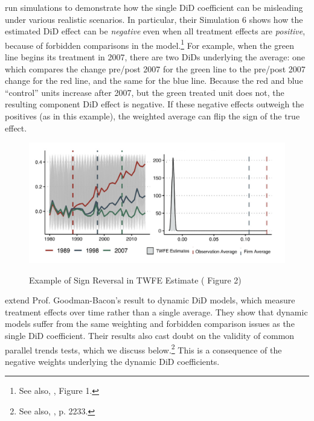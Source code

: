 \documentclass[12pt]{article}
\begin{document}
\citet{baker2022much} run simulations to demonstrate how the single DiD coefficient can be misleading under various realistic scenarios. In particular, their Simulation 6 shows how the estimated DiD effect can be \textit{negative} even when all treatment effects are \textit{positive}, because of forbidden comparisons in the model.\footnote{See also, \citet{sunshapiro2022a}, Figure 1.}  For example, when the green line begins its treatment in  2007, there are two DiDs underlying the average: one which compares the change pre/post 2007 for the green line to the pre/post 2007 change for the red line, and the same for the blue line. Because the red and blue “control” units increase after 2007, but the green treated unit does not, the resulting component DiD effect is negative. If these negative effects outweigh the positives (as in this example), the weighted average can flip the sign of the true effect.
\begin{figure}[H]
    \centering
    \caption{Example of Sign Reversal in TWFE Estimate (\citet{baker2022much} Figure 2)}
    \includegraphics[width=6in]{Figures/Baker et al. (2022) Figure 2.png}
    \label{fig:baker-fig2}
\end{figure}
\noindent \citet{sunabr2021a} extend Prof. Goodman-Bacon’s result to dynamic DiD models, which measure treatment effects over time rather than a single average. They show that dynamic models suffer from the same weighting and forbidden comparison issues as the single DiD coefficient. Their results also cast doubt on the validity of common parallel trends tests, which we discuss below.\footnote{See also, \citet{roth2023s}, p. 2233.}  This is a consequence of the negative weights underlying the dynamic DiD coefficients.
\end{document}
